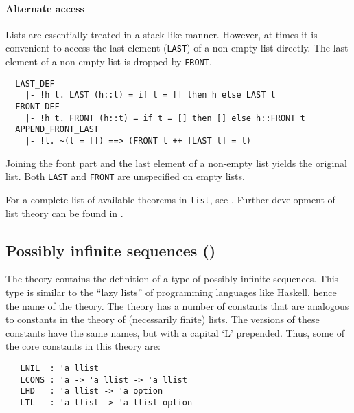 \paragraph {Alternate access}

Lists are essentially treated in a stack-like manner. However, at
times it is convenient to access the last element
({\small\verb+LAST+}) of a non-empty list directly. The last element
of a non-empty list is dropped by {\small\verb+FRONT+}.
%
{\small
\begin{verbatim}
  LAST_DEF
    |- !h t. LAST (h::t) = if t = [] then h else LAST t
  FRONT_DEF
    |- !h t. FRONT (h::t) = if t = [] then [] else h::FRONT t
  APPEND_FRONT_LAST
    |- !l. ~(l = []) ==> (FRONT l ++ [LAST l] = l)
\end{verbatim}
}
%
Joining the front part and the last element of a non-empty list yields
the original list.  Both {\small\verb+LAST+} and {\small\verb+FRONT+}
are unspecified on empty lists.

\noindent For a complete list of available theorems in
{\small\verb+list+}, see \REFERENCE.  Further development of list
theory can be found in .


\subsection{Possibly infinite sequences ()}

The theory  contains the definition of a type of
possibly infinite sequences.  This type is similar to the ``lazy
lists'' of programming languages like Haskell, hence the name of the
theory.  The  theory has a number of constants that
are analogous to constants in the theory of (necessarily finite)
lists.  The  versions of these constants have the
same names, but with a capital `L\/' prepended.  Thus, some of the core
constants in this theory are:

{\small
\begin{verbatim}
   LNIL  : 'a llist
   LCONS : 'a -> 'a llist -> 'a llist
   LHD   : 'a llist -> 'a option
   LTL   : 'a llist -> 'a llist option
\end{verbatim}
}

